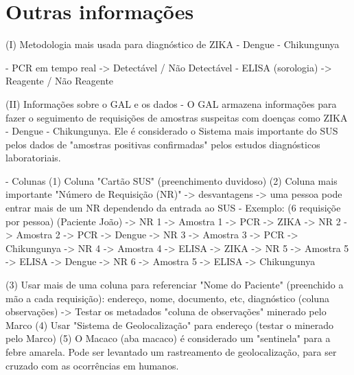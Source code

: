 \chapter{Outras informações}

(I) Metodologia mais usada para diagnóstico de ZIKA - Dengue - Chikungunya

- PCR em tempo real -> Detectável / Não Detectável
- ELISA (sorologia) -> Reagente / Não Reagente

(II) Informações sobre o GAL e os dados
- O GAL armazena informações para fazer o seguimento de requisições de amostras suspeitas com doenças como ZIKA - Dengue - Chikungunya. Ele é considerado o Sistema mais importante do SUS pelos dados de "amostras positivas confirmadas" pelos estudos diagnósticos laboratoriais.

- Colunas 
	(1) Coluna "Cartão SUS" (preenchimento duvidoso)
	(2) Coluna mais importante "Número de Requisição (NR)" -> desvantagens -> uma pessoa pode entrar mais de um NR dependendo da entrada ao SUS
		- Exemplo: (6 requisiçõe por pessoa)
				(Paciente João)	->	NR 1	->	Amostra 1 	->	PCR -> ZIKA
								->	NR 2	->	Amostra 2 	->	PCR -> Dengue
								->	NR 3	->	Amostra 3 	->	PCR -> Chikungunya
								->	NR 4	->	Amostra 4 	->	ELISA -> ZIKA
								->	NR 5	->	Amostra 5 	->	ELISA -> Dengue
								->	NR 6	->	Amostra 5 	->	ELISA -> Chikungunya

	(3) Usar mais de uma coluna para referenciar "Nome do Paciente" (preenchido a mão a cada requisição): endereço, nome, documento, etc, diagnóstico (coluna observações)
		-> Testar os metadados "coluna de observações" minerado pelo Marco
	(4) Usar "Sistema de Geolocalização" para endereço (testar o minerado pelo Marco)
	(5) O Macaco (aba macaco) é considerado um "sentinela" para a febre amarela. Pode ser levantado um rastreamento de geolocalização, para ser cruzado com as ocorrências em humanos.
